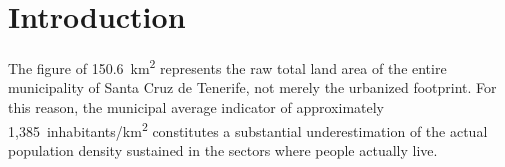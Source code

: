 \section{Introduction}


The figure of 150.6~km\textsuperscript{2} represents the raw total land area of the entire municipality of Santa Cruz de Tenerife, not merely the urbanized footprint. For this reason, the municipal average indicator of approximately 1,385~inhabitants/km\textsuperscript{2} constitutes a substantial underestimation of the actual population density sustained in the sectors where people actually live.

